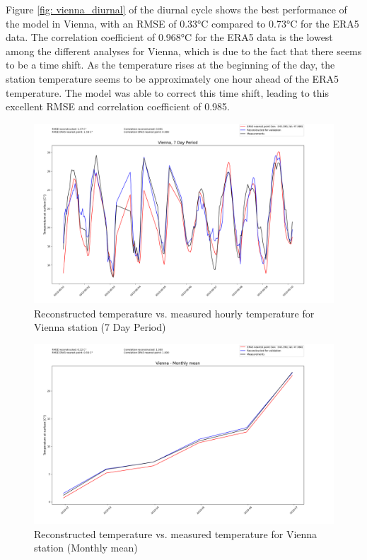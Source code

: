 Figure \ref{fig: vienna_diurnal} of the diurnal cycle shows the best performance of the model in Vienna, with an RMSE of 0.33°C compared to 0.73°C for the ERA5 data.
The correlation coefficient of 0.968°C for the ERA5 data is the lowest among the different analyses for Vienna, which is due to the fact that there seems to be a time shift.
As the temperature rises at the beginning of the day, the station temperature seems to be approximately one hour ahead of the ERA5 temperature.
The model was able to correct this time shift, leading to this excellent RMSE and correlation coefficient of 0.985.

\begin{figure}
\centering
\includegraphics[width=1.00\textwidth]{resources/images/charts/vienna_eval_grib_final/Vienna, 7 Day Period_1_2_3.png}
\caption{Reconstructed temperature vs. measured hourly temperature for Vienna station (7 Day Period)}
\label{fig: vienna_7day}
\end{figure}

\begin{figure}
\centering
\includegraphics[width=1.00\textwidth]{resources/images/charts/vienna_eval_grib_final/Vienna - Monthly mean.png}
\caption{Reconstructed temperature vs. measured temperature for Vienna station (Monthly mean)}
\label{fig: vienna_monthly}
\end{figure}

